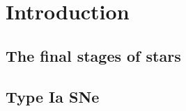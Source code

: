 \documentclass[a4paper,oneside,12pt, class=Latex/Classes/PhDthesisPSnPDF, crop=false]{standalone}
\begin{document}
\doublespacing
\chapter{Introduction}
\label{chap:intro}

\section{The final stages of stars}

\section{Type Ia SNe}
\end{document}
